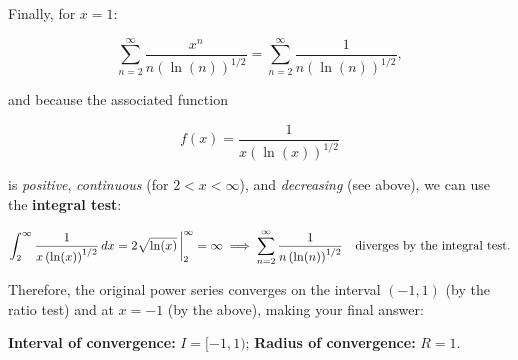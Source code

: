 \documentclass[12pt]{article}
\newcommand{\infsum}[3]{\sum_{{#1}={#2}}^\infty {#3}}
\begin{document}
	Finally, for $x=1$:\vspace{-4.5mm}
	
	$$\infsum{n}{2}{\frac{x^n}{n\left(\ln(n)\right)^{1/2}}}=\infsum{n}{2}{\frac{1}{n\left(\ln(n)\right)^{1/2}}},$$
	
	\noindent and because the associated function\vspace{-4.5mm}
	
	$$f(x)=\frac{1}{x\left(\ln(x)\right)^{1/2}}$$
	
	\noindent is \textit{positive}, \textit{continuous} (for $2<x<\infty$), and \textit{decreasing} (see above), we can use the \textbf{integral test}:\vspace{-7.5mm}
	
	$$\int_2^\infty\frac{1}{x\left(\ln(x)\right)^{1/2}}\,dx=2\sqrt{\ln(x)}\,\bigg|_2^\infty=\infty \implies \infsum{n}{2}{\frac{1}{n\left(\ln(n)\right)^{1/2}}}\text{\quad diverges by the integral test}.$$
	
	Therefore, the original power series converges on the interval $(-1,1)$ (by the ratio test) and at $x=-1$ (by the above), making your final answer:
	\begin{center}\textbf{Interval of convergence:} $I=[-1,1)$; \textbf{Radius of convergence:} $R=1$. \qedsymbol\end{center}
\end{document}
